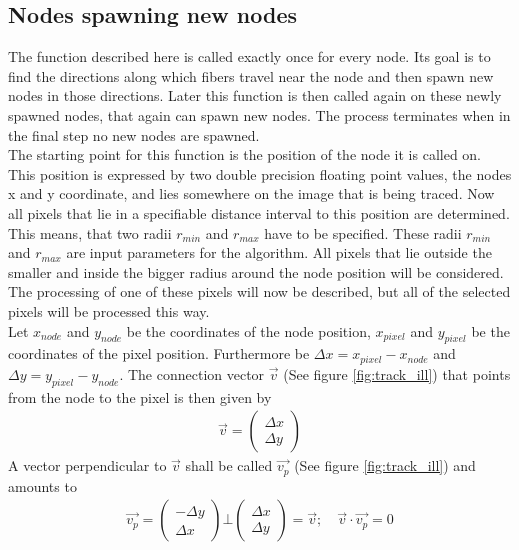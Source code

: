 \documentclass[12pt,english,twocolumn]{revtex4}
\begin{document}
\subsection{Nodes spawning new nodes} \label{sec:procreate}
The function described here is called exactly once for every node. Its goal is to find the directions along which fibers travel near the node and then spawn new nodes in those directions. Later this function is then called again on these newly spawned nodes, that again can spawn new nodes. The process terminates when in the final step no new nodes are spawned.\\
The starting point for this function is the position of the node it is called on. This position is expressed by two double precision floating point values, the nodes x and y coordinate, and lies somewhere on the image that is being traced. Now all pixels that lie in a specifiable distance interval to this position are determined. This means, that two radii $r_{min}$ and $r_{max}$ have to be specified. These radii $r_{min}$ and $r_{max}$ are input parameters for the algorithm. All pixels that lie outside the smaller and inside the bigger radius around the node position will be considered. The processing of one of these pixels will now be described, but all of the selected pixels will be processed this way.\\
Let $x_{node}$ and $y_{node}$ be the coordinates of the node position, $x_{pixel}$ and $y_{pixel}$ be the coordinates of the pixel position. Furthermore be $\Delta x = x_{pixel} - x_{node}$ and $\Delta y = y_{pixel} - y_{node}$. The connection vector $\vec{v}$ (See figure \ref{fig:track_ill}) that points from the node to the pixel is then given by
\begin{align*}
	\vec{v} = \left(\begin{array}{r} \Delta x \\ \Delta y \end{array} \right)
\end{align*}
A vector perpendicular to $\vec{v}$ shall be called $\vec{v_p}$ (See figure \ref{fig:track_ill}) and amounts to
\begin{align*}
	\vec{v_p} = \left(\begin{array}{r} -\Delta y \\ \Delta x \end{array} \right) \bot \left(\begin{array}{r} \Delta x \\ \Delta y \end{array} \right) = \vec{v}; \quad \vec{v} \cdot \vec{v_p} = 0
\end{align*}
\end{document}
